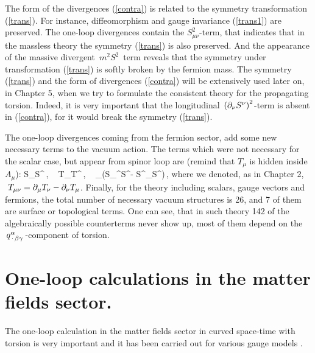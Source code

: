 The form of the divergences (\ref{contra}) is related to 
the symmetry transformation (\ref{trans}). For instance, 
diffeomorphism and gauge invariance (\ref{trans1}) are preserved. 
The one-loop divergences contain the $S_{\mu\nu}^2$-term, that 
indicates that in the massless theory the symmetry (\ref{trans}) 
is also preserved. And the appearance of the massive divergent 
$\,m^2S^2\,$ term reveals that the symmetry under transformation 
(\ref{trans}) is softly broken by the fermion mass. The symmetry 
(\ref{trans}) and the form of divergences (\ref{contra}) will be 
extensively used later on, in Chapter 5, when we try to formulate 
the consistent theory for the propagating torsion. Indeed, it 
is very important that the longitudinal 
$\,\left(\partial_\nu S^\nu\right)^2$-term is absent 
in (\ref{contra}), for it would break the symmetry (\ref{trans}).

The one-loop divergences coming from the fermion sector, 
add some new necessary terms to the vacuum 
action. The terms which were not necessary for the 
scalar case, but appear from spinor loop are (remind that
$T_\mu$ is hidden inside $A_\mu$):
\beq
S_{\mu\nu}S^{\mu\nu}\,,\,\,\,\,\,
T_{\mu\nu}T^{\mu\nu}\,,\,\,\,\,\,
\na_\mu(S_\nu\na^\nu S^\mu - S^\mu\na_\nu S^\nu)\,,
\label{extravac!!!}
\eeq
where we denoted, as in Chapter 2,
 $\,\,T_{\mu\nu} = \partial_\mu T_\nu - \partial_\nu T_\mu$.
Finally, for the theory including scalars, gauge vectors
and fermions, the total number of necessary vacuum structures
is 26, and 7 of them are surface or topological terms. 
One can see, that in such theory 142 of the algebraically 
possible counterterms \cite{chris} never show up, most of 
them depend on the $\,q^\alpha_{\,\cdot\,\beta\gamma}\,$-component of 
torsion. 

\section{One-loop calculations in the matter fields 
sector.}

The one-loop calculation in the matter fields sector
in curved space-time with torsion is very important and
it has been carried out for various gauge models 
\cite{bush1,bush-Izv,bush2,njl,sh-alexeev}. 

